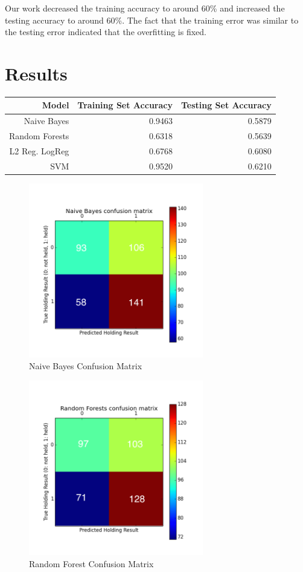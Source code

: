 \documentclass[journal]{IEEEtran}
\begin{document}
Our work decreased the training accuracy to around 60\% and increased the testing accuracy to around 60\%. The fact that the training error was similar to the testing error indicated that the overfitting is fixed. 

\section{Results}

\begin{table}[ht]
\centering
\begin{tabular}{rrr}
  \hline
Model & Training Set Accuracy & Testing Set Accuracy \\
  \hline
Naive Bayes &	0.9463 & 0.5879	\\
Random Forests & 0.6318 &  0.5639	 \\
L2 Reg. LogReg  &	0.6768 &	0.6080 \\
SVM & 0.9520 &  0.6210 \\
   \hline
\end{tabular}
\end{table}

\begin{figure}
    \centering
    \includegraphics[width=3in]{nbConfusion.png}
    \caption{Naive Bayes Confusion Matrix}
    \label{fig:nb}
\end{figure}

\begin{figure}
    \centering
    \includegraphics[width=3in]{rfConfusion.png}
    \caption{Random Forest Confusion Matrix}
    \label{fig:nb}
\end{figure}
\end{document}

